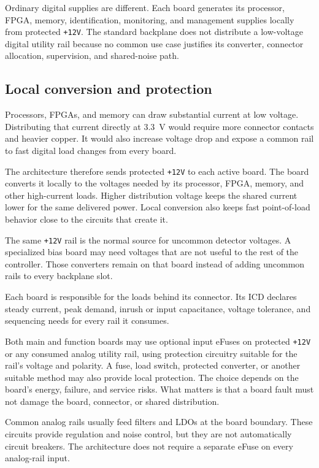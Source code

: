Ordinary digital supplies are different. Each board generates its processor, FPGA, memory, identification, monitoring, and management supplies locally from protected \texttt{+12V}. The standard backplane does not distribute a low-voltage digital utility rail because no common use case justifies its converter, connector allocation, supervision, and shared-noise path.

\subsection{Local conversion and protection}

Processors, FPGAs, and memory can draw substantial current at low voltage. Distributing that current directly at 3.3~V would require more connector contacts and heavier copper. It would also increase voltage drop and expose a common rail to fast digital load changes from every board.

The architecture therefore sends protected \texttt{+12V} to each active board. The board converts it locally to the voltages needed by its processor, FPGA, memory, and other high-current loads. Higher distribution voltage keeps the shared current lower for the same delivered power. Local conversion also keeps fast point-of-load behavior close to the circuits that create it.

The same \texttt{+12V} rail is the normal source for uncommon detector voltages. A specialized bias board may need voltages that are not useful to the rest of the controller. Those converters remain on that board instead of adding uncommon rails to every backplane slot.


Each board is responsible for the loads behind its connector. Its ICD declares steady current, peak demand, inrush or input capacitance, voltage tolerance, and sequencing needs for every rail it consumes.

Both main and function boards may use optional input eFuses on protected \texttt{+12V} or any consumed analog utility rail, using protection circuitry suitable for the rail's voltage and polarity. A fuse, load switch, protected converter, or another suitable method may also provide local protection. The choice depends on the board's energy, failure, and service risks. What matters is that a board fault must not damage the board, connector, or shared distribution.

Common analog rails usually feed filters and LDOs at the board boundary. These circuits provide regulation and noise control, but they are not automatically circuit breakers. The architecture does not require a separate eFuse on every analog-rail input.

